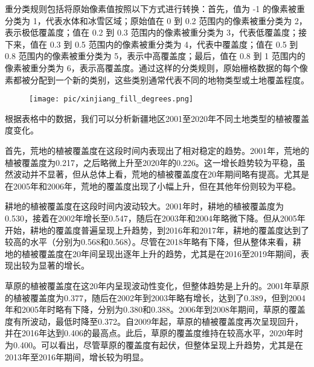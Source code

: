 \documentclass{article}
\begin{document}
		\par
		重分类规则包括将原始像素值按照以下方式进行转换：首先，值为 -1 的像素被重分类为 1，代表水体和冰雪区域；原始值在 0 到 0.2 范围内的像素被重分类为 2，表示极低覆盖度；值在 0.2 到 0.3 范围内的像素被重分类为 3，代表低覆盖度；接下来，值在 0.3 到 0.5 范围内的像素被重分类为 4，代表中覆盖度；值在 0.5 到 0.8 范围内的像素被重分类为 5，表示中高覆盖度；最后，值在 0.8 到 1 范围内的像素被重分类为 6，表示高覆盖度。通过这样的分类规则，原始栅格数据的每个像素都被分配到一个新的类别，这些类别通常代表不同的地物类型或土地覆盖程度。
		
		\begin{figure}[H]  %
			\centering
			\texttt{[image: pic/xinjiang\_fill\_degrees.png]} %
		\end{figure}
				
		\par 根据表格中的数据，我们可以分析新疆地区2001至2020年不同土地类型的植被覆盖度变化。
		
		首先，荒地的植被覆盖度在这段时间内表现出了相对稳定的趋势。2001年，荒地的植被覆盖度为0.217，之后略微上升至2020年的0.226。这一增长趋势较为平稳，虽然波动并不显著，但从总体上看，荒地的植被覆盖度在20年期间略有提高。尤其是在2005年和2006年，荒地的覆盖度出现了小幅上升，但在其他年份则较为平稳。
		
		耕地的植被覆盖度在这段时间内波动较大。2001年时，耕地的植被覆盖度为0.530，接着在2002年增长至0.547，随后在2003年和2004年略微下降。但从2005年开始，耕地的覆盖度普遍呈现上升趋势，到2016年和2017年，耕地的覆盖度达到了较高的水平（分别为0.568和0.568）。尽管在2018年略有下降，但从整体来看，耕地的植被覆盖度在20年间呈现出逐年上升的趋势，尤其是在2016至2019年期间，表现出较为显著的增长。
		
		草原的植被覆盖度在这20年内呈现波动性变化，但整体趋势是上升的。2001年草原的植被覆盖度为0.377，随后在2002年到2003年略有增长，达到了0.389，但到2004年和2005年时略有下降，分别为0.380和0.388。2006年到2008年期间，草原的覆盖度有所波动，最低时降至0.372。自2009年起，草原的植被覆盖度再次呈现回升，并在2016年达到0.406的最高点。此后，草原的覆盖度维持在较高水平，2020年时为0.400。可以看出，尽管草原的覆盖度有起伏，但整体呈现上升趋势，尤其是在2013年至2016年期间，增长较为明显。
		
\end{document}

